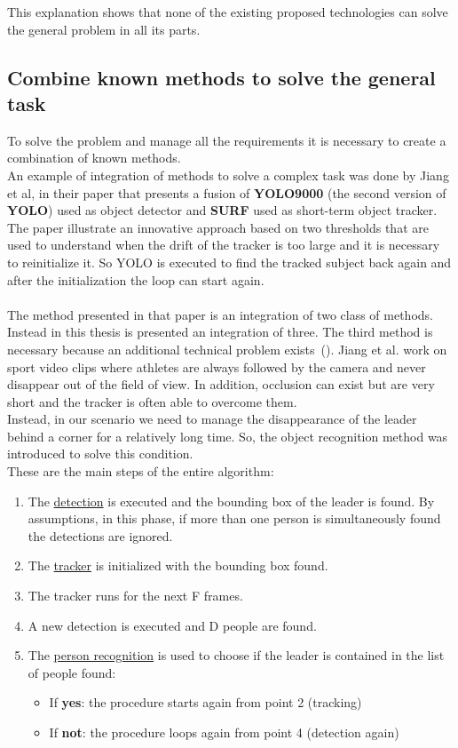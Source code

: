 This explanation shows that none of the existing proposed technologies can solve the general problem in all its parts.

\subsection{Combine known methods to solve the general task}
To solve the problem and manage all the requirements it is necessary to create a combination of known methods.\\
An example of integration of methods to solve a complex task was done by Jiang et al, in their paper\cite{multi-feature-fusion-and-YOLO} that presents a fusion of \textbf{YOLO9000}\cite{yoloV2} (the second version of \textbf{YOLO}\cite{yolo}) used as object detector and \textbf{SURF}\cite{surf} used as short-term object tracker.\\
The paper illustrate an innovative approach based on two thresholds that are used to understand when the drift of the tracker is too large and it is necessary to reinitialize it. So YOLO is executed to find the tracked subject back again and after the initialization the loop can start again.\\
\\
The method presented in that paper is an integration of two class of methods. Instead in this thesis is presented an integration of three. The third method is necessary because an additional technical problem exists~(). Jiang et al. work on sport video clips where athletes are always followed by the camera and never disappear out of the field of view. In addition, occlusion can exist but are very short and the tracker is often able to overcome them.\\
Instead, in our scenario we need  to manage the disappearance of the leader behind a corner for a relatively long time. So, the object recognition method was introduced to solve this condition.\\ 
These are the main steps of the entire algorithm:
\begin{enumerate}
	\item The \underline{detection} is executed and the bounding box of the leader is found. By assumptions, in this phase, if more than one person is simultaneously found the detections are ignored.
	\item The \underline{tracker} is initialized with the bounding box found.
	\item The tracker runs for the next F frames.
	\item A new detection is executed and D people are found.
	\item The \underline{person recognition} is used to choose if the leader is contained in the list of people found:
	\begin{itemize}
		\item If \textbf{yes}: the procedure starts again from point 2 (tracking)
		\item If \textbf{not}: the procedure loops again from point 4 (detection again)
	\end{itemize}
\end{enumerate}

